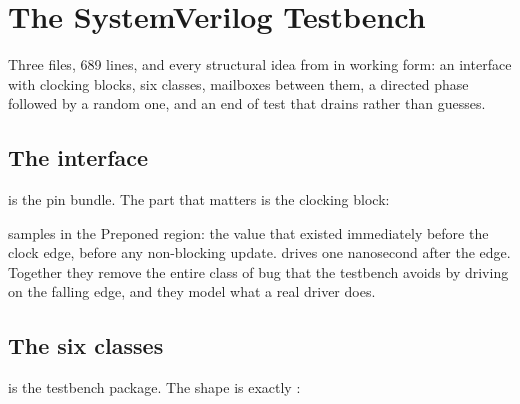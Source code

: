 \clearpage
{}

\clearpage
\section{The SystemVerilog Testbench}
\label{sec:case:svtb}

Three files, 689 lines, and every structural idea from  in
working form: an interface with clocking blocks, six classes, mailboxes
between them, a directed phase followed by a random one, and an end of test
that drains rather than guesses.

\subsection{The interface}

 is the pin bundle. The part that matters is the clocking
block:


 samples in the Preponed region: the value that existed
immediately before the clock edge, before any non-blocking update.  drives one nanosecond after the edge. Together they remove the entire
class of bug that the \VHDL{} testbench avoids by driving on the falling edge,
and they model what a real driver does.

\subsection{The six classes}

 is the testbench package. The shape is exactly
:

